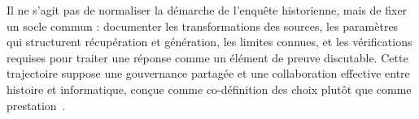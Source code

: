 \documentclass[final, fra]{anthology-ch}     %
\begin{document}
Il ne s’agit pas de normaliser la démarche de l'enquête historienne, mais de fixer un socle commun : documenter les transformations des sources, les paramètres qui structurent récupération et génération, les limites connues, et les vérifications requises pour traiter une réponse comme un élément de preuve discutable. 
Cette trajectoire suppose une gouvernance partagée et une collaboration effective entre histoire et informatique, conçue comme co-définition des choix plutôt que comme prestation~\cite{dumouza_lamasse_rygiel_2023_histoireDonnees_framespa}.

\printbibliography
\end{document}
